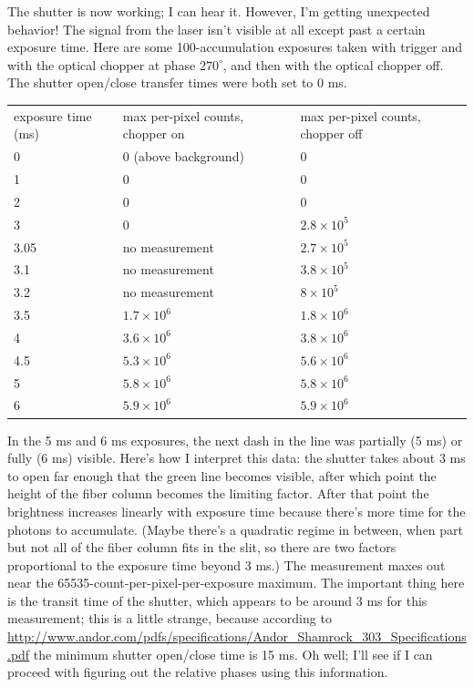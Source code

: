 \documentclass[11pt]{labbook}
\begin{document}
The shutter is now working; I can hear it. However, I'm getting unexpected behavior! The signal from the laser isn't visible at all except past a certain exposure time. Here are some 100-accumulation exposures taken with trigger and with the optical chopper at phase \(270^\circ\), and then with the optical chopper off. The shutter open/close transfer times were both set to 0 ms.
\begin{table}[H]
\centering
\begin{tabular}{l|l|l}
exposure time (ms) & max per-pixel counts, chopper on & max per-pixel counts, chopper off \\
0 & 0 (above background) & 0 \\
1 & 0 & 0 \\
2 & 0 & 0 \\
3 & 0 & \(2.8 \times 10^5\) \\
3.05 & no measurement & \(2.7 \times 10^5\) \\
3.1 & no measurement & \(3.8 \times 10^5\) \\
3.2 & no measurement & \(8 \times 10^5\) \\
3.5 & \(1.7 \times 10^6\) & \(1.8 \times 10^6\) \\
4 & \(3.6 \times 10^6\) & \(3.8 \times 10^6\) \\
4.5 & \(5.3 \times 10^6\) & \(5.6 \times 10^6\)\\
5 & \(5.8 \times 10^6\) & \(5.8 \times 10^6\)\\
6 & \(5.9 \times 10^6\) & \(5.9 \times 10^6\)
\end{tabular}
\end{table}
In the 5 ms and 6 ms exposures, the next dash in the line was partially (5 ms) or fully (6 ms) visible. Here's how I interpret this data: the shutter takes about 3 ms to open far enough that the green line becomes visible, after which point the height of the fiber column becomes the limiting factor. After that point the brightness increases linearly with exposure time because there's more time for the photons to accumulate. (Maybe there's a quadratic regime in between, when part but not all of the fiber column fits in the slit, so there are two factors proportional to the exposure time beyond 3 ms.) The measurement maxes out near the 65535-count-per-pixel-per-exposure maximum. The important thing here is the transit time of the shutter, which appears to be around 3 ms for this measurement; this is a little strange, because according to \url{http://www.andor.com/pdfs/specifications/Andor\_Shamrock\_303\_Specifications.pdf} the minimum shutter open/close time is 15 ms. Oh well; I'll see if I can proceed with figuring out the relative phases using this information.
\end{document}
